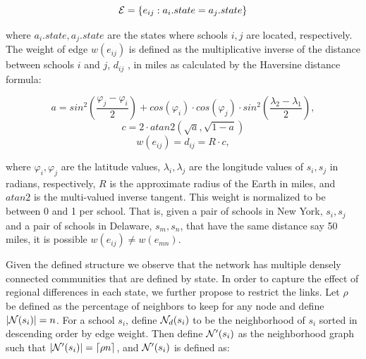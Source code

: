 
\begin{displaymath}
	\mathcal{E} = \left\{ e_{ij} : a_i.state = a_j.state \right\}
\end{displaymath}

\noindent where $a_i.state, a_j.state$ are the states where schools $i,j$ are located, respectively. The weight of edge $w(e_{ij})$ is defined as the multiplicative inverse of the distance between schools $i$ and $j$, $d_{ij}$ , in miles as calculated by the Haversine distance formula:

\begin{equation*}
a = sin^2\left(\frac{\varphi_j-\varphi_i}{2}\right) + cos(\varphi_i) \cdot cos(\varphi_j) \cdot sin^2\left(\frac{\lambda_2 - \lambda_1}{2}\right),
\end{equation*}
\begin{equation*}
c = 2 \cdot atan2( \sqrt{a}, \sqrt{1-a})
\end{equation*}
\begin{equation*}
w(e_{ij}) = d_{ij} = R \cdot c,
\end{equation*}

\noindent where $\varphi_i, \varphi_j$ are the latitude values, $\lambda_i, \lambda_j$ are the longitude values of $s_i, s_j$ in radians, respectively, $R$ is the approximate radius of the Earth in miles, and $atan2$ is the multi-valued inverse tangent. This weight is normalized to be between 0 and 1 per school. That is, given a pair of schools in New York, $s_i, s_j$ and a pair of schools in Delaware, $s_m, s_n$, that have the same distance say 50 miles, it is possible $w(e_{ij}) \neq w(e_{mn})$. 

Given the defined structure we observe that the network has multiple densely connected communities that are defined by state. In order to capture the effect of regional differences in each state, we further propose to restrict the links. Let $
\rho$ be defined as the percentage of neighbors to keep for any node and define $|{\mathcal{N}(s_i)}| = n$. For a school $s_i$, define $\mathcal{N}_d(s_i)$ to be the neighborhood of $s_i$ sorted in descending order by edge weight. Then define $\mathcal{N}'(s_i)$ as the neighborhood graph such that $|\mathcal{N}'(s_i)| = \lceil\rho n\rceil$, and $\mathcal{N}'(s_i)$ is defined as:

